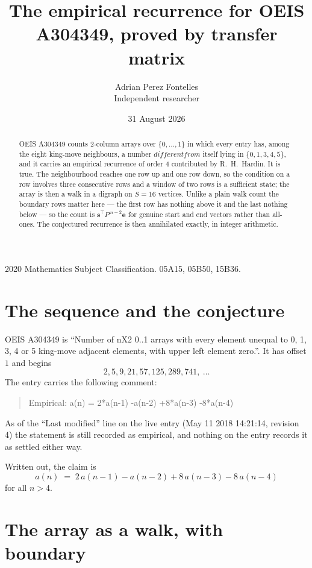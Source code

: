 \documentclass[11pt,a4paper]{article}
\title{The empirical recurrence for OEIS A304349, proved by transfer matrix}
\author{Adrian Perez Fontelles\\ \small Independent researcher}
\date{31 August 2026}
\theoremstyle{plain}
\theoremstyle{definition}
\begin{document}
\maketitle

\begin{abstract}
OEIS A304349 counts $2$-column arrays over $\{0,\dots,1\}$ in which every entry has,
among the eight king-move neighbours, a number $different from$ itself lying in $\{0,1,3,4,5\}$, and it carries an empirical
recurrence of order $4$ contributed by R.~H.~Hardin. It is true. The neighbourhood
reaches one row up and one row down, so the condition on a row involves three consecutive
rows and a window of two rows is a sufficient state; the array is then a walk in a digraph
on $S=16$ vertices. Unlike a plain walk count the boundary rows matter here --- the first
row has nothing above it and the last nothing below --- so the count is
$\mathbf{s}^{\!\top}P^{\,n-2}\mathbf{e}$ for genuine start and end vectors rather than
all-ones. The conjectured recurrence is then annihilated exactly, in integer arithmetic.
\end{abstract}

\noindent\small 2020 Mathematics Subject Classification. 05A15, 05B50, 15B36.\normalsize

\section{The sequence and the conjecture}

OEIS A304349 is ``Number of nX2 0..1 arrays with every element unequal to 0, 1, 3, 4 or 5 king-move adjacent elements, with upper left element zero.''. It has offset
$1$ and begins
\[
2, 5, 9, 21, 57, 125, 289, 741,\ \dots
\]
The entry carries the following comment:
\begin{quote}\small
Empirical: a(n) = 2*a(n-1) -a(n-2) +8*a(n-3) -8*a(n-4)
\end{quote}
As of the ``Last modified'' line on the live entry (May 11 2018 14:21:14, revision
4) the statement is still recorded as empirical, and nothing on the entry
records it as settled either way.

Written out, the claim is
\begin{equation}\label{eq:conj}
a(n)\;=\;2\,a(n-1) - a(n-2) + 8\,a(n-3) - 8\,a(n-4)
\end{equation}
for all $n>4$.

\section{The array as a walk, with boundary}
\end{document}
